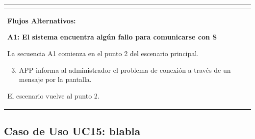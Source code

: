 \begin{longtable}{|l|p{5.5cm}|l|p{2cm}|l|p{1.9cm}|}
{    } \\ \hline

    \multicolumn{6}{|p{15cm}|}{ \textbf{Flujos Alternativos: }
    
    \textbf{A1: El sistema encuentra algún fallo para comunicarse con S}
    
    La secuencia A1 comienza en el punto 2 del escenario principal.
    \begin{enumerate}
        \setcounter{enumi}{2}
        \item APP informa al administrador el problema de conexión a través de un mensaje por la pantalla.
    \end{enumerate}

    El escenario vuelve al punto 2.

    } \\ \hline

\end{longtable}


\subsection{Caso de Uso UC15: blabla}

